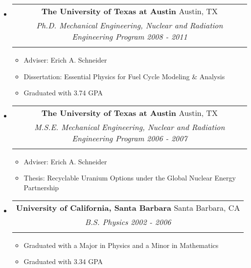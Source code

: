 \documentclass[letterpaper,11pt]{article}
\makeatletter
\newcommand{\resitem}[1]{\item #1 \vspace{-2pt}}
\newcommand{\ressubheading}[4]{
\begin{center}
\begin{tabular*}{6.5in}{l@{\extracolsep{\fill}}r}
    \multicolumn{2}{c}{\textbf{#1} \cftdotfill{\cftdotsep} #2} \\
    \multicolumn{2}{c}{\textit{#3} \cftdotfill{\cftdotsep} \textit{#4}} \\
    \vphantom{E}
\end{tabular*}
\end{center}
\vspace{-24pt}
}
\makeatother
\begin{document}
\begin{itemize}
\item
    \ressubheading{The University of Texas at Austin}{Austin, TX}{Ph.D. Mechanical 
                   Engineering, Nuclear and Radiation Engineering Program}{2008 - 2011}
    \begin{itemize}
        \resitem{Adviser: Erich A. Schneider}
        \resitem{Dissertation: Essential Physics for Fuel Cycle Modeling \& Analysis}
        \resitem{Graduated with 3.74 GPA}
    \end{itemize}

\item
    \ressubheading{The University of Texas at Austin}{Austin, TX}{M.S.E. Mechanical 
                   Engineering, Nuclear and Radiation Engineering Program}{2006 - 2007}
    \begin{itemize}
        \resitem{Adviser: Erich A. Schneider}
        \resitem{Thesis: Recyclable Uranium Options under the Global Nuclear Energy 
                 Partnership}
    \end{itemize}

\item
    \ressubheading{University of California, Santa Barbara}{Santa Barbara, CA}
                  {B.S. Physics}{2002 - 2006}
    \begin{itemize}
        \resitem{Graduated with a Major in Physics and a Minor in Mathematics}
        \resitem{Graduated with 3.34 GPA}
    \end{itemize}
\end{itemize}

\clearpage
\end{document}
